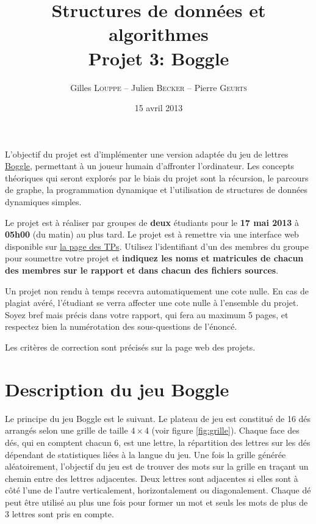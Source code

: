 \documentclass[a4paper,10pt]{article}
\title{
    \textbf{Structures de données et algorithmes}\\
    Projet 3: Boggle
}
\author{Gilles \textsc{Louppe} -- Julien \textsc{Becker} -- Pierre \textsc{Geurts}}
\date{15 avril 2013}
\begin{document}
\maketitle

L'objectif du projet est d'implémenter une version adaptée du jeu de
lettres \href{http://fr.wikipedia.org/wiki/Boggle}{Boggle}, permettant à un
joueur humain d'affronter l'ordinateur. Les concepts théoriques qui
seront explorés par le biais du projet sont la récursion, le parcours
de graphe, la programmation dynamique et l'utilisation de structures de
données dynamiques simples.

Le projet est à réaliser par groupes de {\bf deux} étudiants pour
le {\bf 17 mai 2013} à {\bf 05h00} (du matin) au plus tard. Le projet
est à remettre via une interface web disponible sur
\href{http://www.montefiore.ulg.ac.be/~glouppe/2012-2013/students.info0902.php}{la
  page des TPs}. Utilisez l'identifiant d'un des membres du groupe
  pour soumettre votre projet et \textbf{indiquez les noms et matricules de chacun des membres
  sur le rapport et dans chacun des fichiers sources}.

Un projet non rendu à temps recevra automatiquement une cote nulle. En
cas de plagiat avéré, l'étudiant se verra affecter une cote nulle à
l'ensemble du projet. Soyez bref mais précis dans votre rapport, qui
fera au maximum 5 pages, et respectez bien la numérotation des
sous-questions de l'énoncé.

Les critères de correction sont précisés sur la page web des projets.

\section{Description du jeu Boggle}

Le principe du jeu Boggle est le suivant. Le plateau de jeu est constitué
de 16 dés arrangés selon une grille de taille $4\times 4$ (voir figure
\ref{fig:grille}). Chaque face des dés, qui en comptent chacun 6, est
une lettre, la répartition des lettres sur les dés dépendant de
statistiques liées à la langue du jeu. Une fois la grille générée
aléatoirement, l'objectif du jeu est de trouver des mots sur la grille
en traçant un chemin entre des lettres adjacentes. Deux lettres sont
adjacentes si elles sont à côté l'une de l'autre verticalement,
horizontalement ou diagonalement. Chaque dé peut être utilisé au plus
une fois pour former un mot et seuls les mots de plus de 3 lettres
sont pris en compte.
\end{document}
